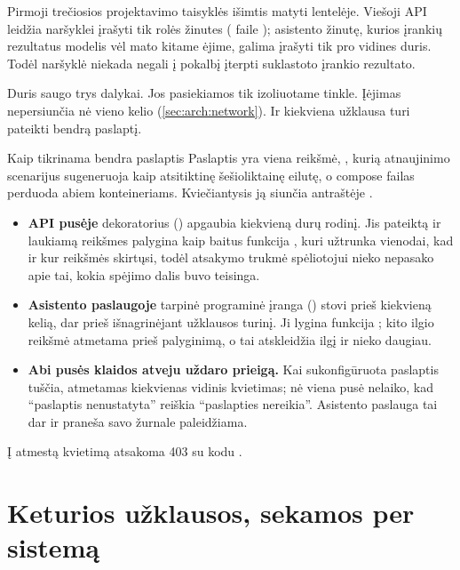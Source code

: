 Pirmoji trečiosios projektavimo taisyklės išimtis matyti lentelėje. Viešoji API leidžia
naršyklei įrašyti tik  rolės žinutes ( faile
); asistento žinutę, kurios įrankių rezultatus modelis vėl mato kitame
ėjime, galima įrašyti tik pro vidines duris. Todėl naršyklė niekada negali į pokalbį įterpti
suklastoto įrankio rezultato.

Duris saugo trys dalykai. Jos pasiekiamos tik izoliuotame tinkle. Įėjimas nepersiunčia nė
vieno  kelio (\cref{sec:arch:network}). Ir kiekviena užklausa turi pateikti
bendrą paslaptį.

\begin{codebox}{Kaip tikrinama bendra paslaptis}
Paslaptis yra viena reikšmė, , kurią atnaujinimo scenarijus
sugeneruoja kaip atsitiktinę šešioliktainę eilutę, o compose failas perduoda abiem
konteineriams. Kviečiantysis ją siunčia antraštėje .

\begin{itemize}
  \item \textbf{API pusėje} dekoratorius 
    () apgaubia kiekvieną durų rodinį. Jis pateiktą ir
    laukiamą reikšmes palygina kaip baitus funkcija , kuri užtrunka
    vienodai, kad ir kur reikšmės skirtųsi, todėl atsakymo trukmė spėliotojui nieko nepasako
    apie tai, kokia spėjimo dalis buvo teisinga.
  \item \textbf{Asistento paslaugoje} tarpinė programinė įranga 
    () stovi prieš kiekvieną  kelią, dar prieš
    išnagrinėjant užklausos turinį. Ji lygina funkcija ; kito ilgio
    reikšmė atmetama prieš palyginimą, o tai atskleidžia ilgį ir nieko daugiau.
  \item \textbf{Abi pusės klaidos atveju uždaro prieigą.} Kai sukonfigūruota paslaptis tuščia,
    atmetamas kiekvienas vidinis kvietimas; nė viena pusė nelaiko, kad \enquote{paslaptis
    nenustatyta} reiškia \enquote{paslapties nereikia}. Asistento paslauga tai dar ir
    praneša savo žurnale paleidžiama.
\end{itemize}
Į atmestą kvietimą atsakoma 403 su kodu .
\end{codebox}

\section{Keturios užklausos, sekamos per sistemą}\label{sec:arch:flows}

